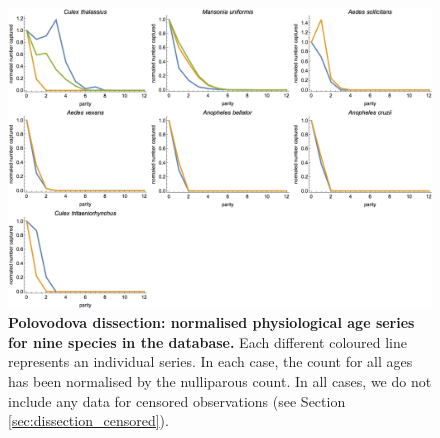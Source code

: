 \documentclass[12pt]{article}
\begin{document}
{\begin{figure}[ht]
	\centerline{\includegraphics[width=1.3\textwidth]{./Figure_files/dissection_parity_data3.png}}
	\caption{\textbf{Polovodova dissection: normalised physiological age series for nine species in the database.} Each different coloured line represents an individual series. In each case, the count for all ages has been normalised by the nulliparous count. In all cases, we do not include any data for censored observations (see Section \ref{sec:dissection_censored}).}\label{fig:dissection_exampleData3}
\end{figure}


}
\end{document}
